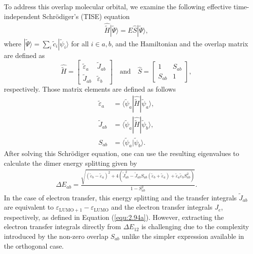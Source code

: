 To address this overlap molecular orbital, we examine the following effective time-independent Schr\"{o}diger's (TISE) equation
\begin{equation} \label{equ:2.95}
\begin{split}
\hat{\tilde{H}}|\tilde{\Psi}\rangle = E\hat{S}|\tilde{\Psi}\rangle,
\end{split}
\end{equation}
where $|\tilde{\Psi}\rangle = \sum_{i} \tilde{c}_{i}|\tilde{\psi}_{i}\rangle$ for all $i\in a,b$, and the Hamiltonian and the overlap matrix are defined as
\begin{equation} \label{equ:2.96}
    \hat{\tilde{H}} = 
    \begin{bmatrix}
        \tilde{\varepsilon}_{a}  &  \tilde{J}_{ab}\\
        \tilde{J}_{ab} & \tilde{\varepsilon}_{b}
    \end{bmatrix}\quad \text{and} \quad
    \hat{S} = 
    \begin{bmatrix}
        1  &  S_{ab}\\
        S_{ab} & 1
    \end{bmatrix},
\end{equation}
respectively.
Those matrix elements are defined as follows
\begin{subequations}
\begin{align} 
   \label{equ:2.97a} 
   \tilde{\varepsilon}_{a} &= \langle \tilde{\psi}_a | \hat{\tilde{H}} | \tilde{\psi}_a \rangle,\\
   \label{equ:2.97b} 
   \tilde{J}_{ab} &= \langle \tilde{\psi}_a | \hat{\tilde{H}} | \tilde{\psi}_b \rangle,\\
   \label{equ:2.97c} 
   S_{ab} &=\langle \tilde{\psi}_a | \tilde{\psi}_b \rangle .
\end{align}
\end{subequations}
After solving this Schr\"{o}diger equation, one can use the resulting eigenvalues to calculate the dimer energy splitting given by
\begin{equation} \label{equ:2.98}
\begin{split}
\Delta E_{ab} = \frac{
\sqrt{
(\tilde{\varepsilon}_b - \tilde{\varepsilon}_a)^2 + 4\left( \tilde{J}_{ab}^2 - \tilde{J}_{ab} S_{ab} (\tilde{\varepsilon}_b + \tilde{\varepsilon}_a) + \tilde{\varepsilon}_a \tilde{\varepsilon}_b S_{ab}^2 \right)
}
}{1 - S_{ab}^2}.
\end{split}
\end{equation}
In the case of electron transfer, this energy splitting and the transfer integrals $\tilde{J}_{ab}$ are equivalent to $\varepsilon_{\text{LUMO}+1} -  \varepsilon_{\text{LUMO}}$ and the electron transfer integrals $J_{e}$, respectively, as defined in Equation (\ref{equ:2.94a}).
However, extracting the electron transfer integrals directly from $\Delta E_{12}$
is challenging due to the complexity introduced by the non-zero overlap $S_{ab}$ unlike the simpler expression available in the orthogonal case.

